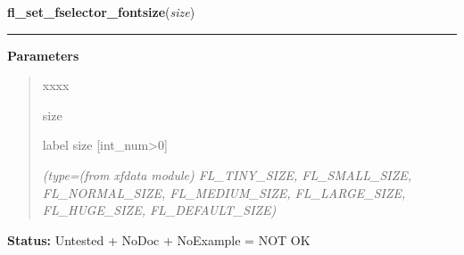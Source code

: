     \label{xformslib:library:fl_set_fselector_fontsize}

    \vspace{0.5ex}

\hspace{.8\funcindent}\begin{boxedminipage}{\funcwidth}

    \raggedright \textbf{fl\_set\_fselector\_fontsize}(\textit{size})

    \vspace{-1.5ex}

    \rule{\textwidth}{0.5\fboxrule}
\setlength{\parskip}{2ex}
\setlength{\parskip}{1ex}
      \textbf{Parameters}
      \vspace{-1ex}

      \begin{quote}
        \begin{Ventry}{xxxx}

          \item[size]

          label size [int\_num{\textgreater}0]

            {\it (type=(from xfdata module) FL\_TINY\_SIZE, FL\_SMALL\_SIZE, FL\_NORMAL\_SIZE, 
FL\_MEDIUM\_SIZE, FL\_LARGE\_SIZE, FL\_HUGE\_SIZE, FL\_DEFAULT\_SIZE)}

        \end{Ventry}

      \end{quote}

\textbf{Status:} Untested + NoDoc + NoExample = NOT OK



    \end{boxedminipage}

    \label{xformslib:library:fl_set_fselector_fontstyle}

    \vspace{0.5ex}

